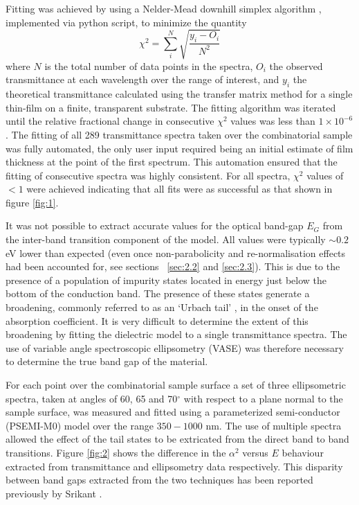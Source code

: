 \documentclass[aps,prl,preprint,showpacs,showkeys,linenumbers]{revtex4-1}
\begin{document}
Fitting was achieved by using a Nelder-Mead downhill simplex algorithm \cite{Nelder1965}, implemented via python script, to minimize the quantity
\begin{equation}
\chi^{2} = \sum_{i}^N\sqrt{\frac{y_i - O_i}{N^2}}
\end{equation}\label{eqn:2}
where $N$ is the total number of data points in the spectra, $O_i$ the observed transmittance at each wavelength over the range of interest, and $y_i$ the theoretical transmittance calculated using the transfer matrix method \cite{Macleod1986} for a single thin-film on a finite, transparent substrate.  The fitting algorithm was iterated until the relative fractional change in consecutive $\chi^2$ values was less than $1\times10^{-6}$. The fitting of all 289 transmittance spectra taken over the combinatorial sample was fully automated, the only user input required being an initial estimate of film thickness at the point of the first spectrum. This automation ensured that the fitting of consecutive spectra was highly consistent. For all spectra, $\chi^2$ values of $<1$ were achieved indicating that all fits were as successful as that shown in figure \ref{fig:1}.

It was not possible to extract accurate values for the optical band-gap $E_G$ from the inter-band transition component of the model. All values were typically $\sim 0.2$ eV lower than expected (even once non-parabolicity and re-normalisation effects had been accounted for, see sections ~\ref{sec:2.2} and \ref{sec:2.3}).  This is due to the presence of a population of impurity states located in energy just below the bottom of the conduction band. The presence of these states generate a broadening, commonly referred to as an `Urbach tail' \cite{Urbach1953}, in the onset of the absorption coefficient. It is very difficult to determine the extent of this broadening by fitting the dielectric model to a single transmittance spectra. The use of variable angle spectroscopic ellipsometry (VASE) was therefore necessary to determine the true band gap of the material. 

For each point over the combinatorial sample surface a set of three ellipsometric spectra, taken at angles of 60, 65 and 70$^{\circ}$ with respect to a plane normal to the sample surface, was measured and fitted using a parameterized semi-conductor (PSEMI-M0) model \cite{Paulson1998} over the range $350 - 1000$ nm. The use of multiple spectra allowed the effect of the tail states to be extricated from the direct band to band transitions.  Figure \ref{fig:2} shows the difference in the $\alpha^2$ versus $E$ behaviour extracted from transmittance and ellipsometry data respectively. This disparity between band gaps extracted from the two techniques has been reported previously by Srikant \cite{Srikant1998}.
\end{document}
